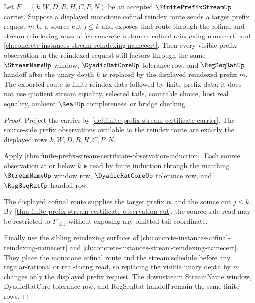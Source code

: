 \begin{theorem}
\label{thm:finite-prefix-stream-cofinal-reindex-stability}
Let $F=(k,W,D,R,H,C,P,N)$ be an accepted $\FinitePrefixStreamUp$ carrier. Suppose a displayed monotone cofinal reindex route sends a target prefix request $m$ to a source cut $j \leq k$ and exposes that route through the cofinal and stream-reindexing rows of \autoref{ch:concrete-instances-cofinal-reindexing-namecert} and \autoref{ch:concrete-instances-stream-reindexing-namecert}. Then every visible prefix observation in the reindexed request still factors through the same $\StreamNameUp$ window, $\DyadicRatCoreUp$ tolerance row, and $\RegSeqRatUp$ handoff after the unary depth $k$ is replaced by the displayed reindexed prefix $m$. The exported route is finite reindex data followed by finite prefix data; it does not use quotient stream equality, selected tails, countable choice, host real equality, ambient $\RealUp$ completeness, or bridge checking.
\end{theorem}
\begin{proof}
Project the carrier by \autoref{def:finite-prefix-stream-certificate-carrier}. The source-side prefix observations available to the reindex route are exactly the displayed rows $k,W,D,R,H,C,P,N$.

Apply \autoref{thm:finite-prefix-stream-certificate-observation-induction}. Each source observation at or below $k$ is read by finite induction through the matching $\StreamNameUp$ window row, $\DyadicRatCoreUp$ tolerance row, and $\RegSeqRatUp$ handoff row.

The displayed cofinal route supplies the target prefix $m$ and the source cut $j \leq k$. By \autoref{thm:finite-prefix-stream-certificate-observation-cut}, the source-side read may be restricted to $F_{\leq j}$ without exposing any omitted tail coordinate.

Finally use the sibling reindexing surfaces of \autoref{ch:concrete-instances-cofinal-reindexing-namecert} and \autoref{ch:concrete-instances-stream-reindexing-namecert}. They place the monotone cofinal route and the stream schedule before any regular-rational or real-facing read, so replacing the visible unary depth by $m$ changes only the displayed prefix request. The downstream StreamName window, DyadicRatCore tolerance row, and RegSeqRat handoff remain the same finite rows.
\end{proof}

